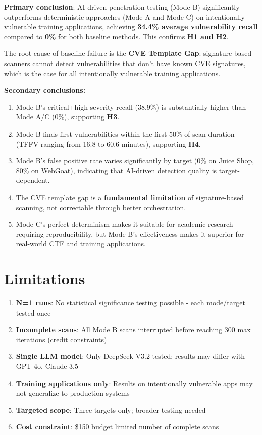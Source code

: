 \documentclass[12pt,a4paper,oneside]{book}
\begin{document}
\textbf{Primary conclusion}: AI-driven penetration testing (Mode B) significantly outperforms deterministic approaches (Mode A and Mode C) on intentionally vulnerable training applications, achieving \textbf{34.4\% average vulnerability recall} compared to \textbf{0\%} for both baseline methods. This confirms \textbf{H1 and H2}.

The root cause of baseline failure is the \textbf{CVE Template Gap}: signature-based scanners cannot detect vulnerabilities that don't have known CVE signatures, which is the case for all intentionally vulnerable training applications.

\textbf{Secondary conclusions:}

\begin{enumerate}
    \item Mode B's critical+high severity recall (38.9\%) is substantially higher than Mode A/C (0\%), supporting \textbf{H3}.
    
    \item Mode B finds first vulnerabilities within the first 50\% of scan duration (TFFV ranging from 16.8 to 60.6 minutes), supporting \textbf{H4}.
    
    \item Mode B's false positive rate varies significantly by target (0\% on Juice Shop, 80\% on WebGoat), indicating that AI-driven detection quality is target-dependent.
    
    \item The CVE template gap is a \textbf{fundamental limitation} of signature-based scanning, not correctable through better orchestration.
    
    \item Mode C's perfect determinism makes it suitable for academic research requiring reproducibility, but Mode B's effectiveness makes it superior for real-world CTF and training applications.
\end{enumerate}

\section{Limitations}

\begin{enumerate}
    \item \textbf{N=1 runs}: No statistical significance testing possible - each mode/target tested once
    \item \textbf{Incomplete scans}: All Mode B scans interrupted before reaching 300 max iterations (credit constraints)
    \item \textbf{Single LLM model}: Only DeepSeek-V3.2 tested; results may differ with GPT-4o, Claude 3.5
    \item \textbf{Training applications only}: Results on intentionally vulnerable apps may not generalize to production systems
    \item \textbf{Targeted scope}: Three targets only; broader testing needed
    \item \textbf{Cost constraint}: \$150 budget limited number of complete scans
\end{enumerate}
\end{document}
